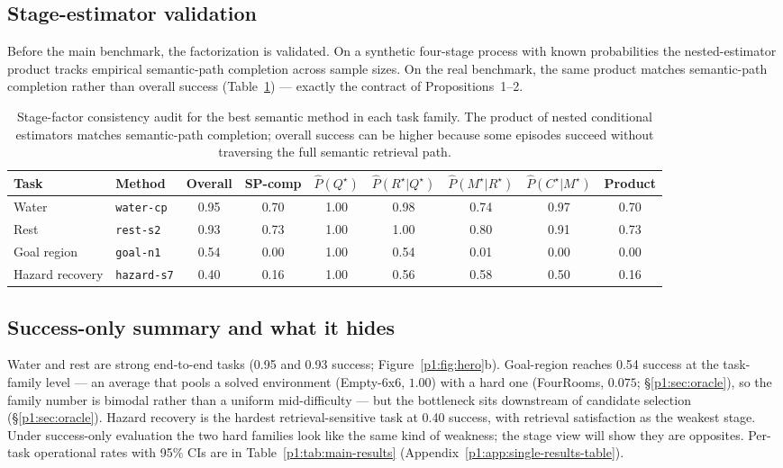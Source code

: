 \documentclass{article}
\begin{document}
\subsection{Stage-estimator validation}
\label{p1:sec:validation}

Before the main benchmark, the factorization is validated. On a
synthetic four-stage process with known probabilities the
nested-estimator product tracks empirical semantic-path completion
across sample sizes. On the real benchmark, the same product matches
semantic-path completion rather than overall success
(Table~\ref{p1:tab:consistency}) --- exactly the contract of
Propositions~1--2.

\begin{table}[t]
  \caption{Stage-factor consistency audit for the best semantic method in each task family. The product of nested conditional estimators matches semantic-path completion; overall success can be higher because some episodes succeed without traversing the full semantic retrieval path.}
  \label{p1:tab:consistency}
  \centering
  \small
  \begin{tabular}{p{1.7cm}p{2.5cm}c c c c c c c}
    \toprule
    Task & Method & Overall & SP-comp & $\hat P(Q^\star)$ & $\hat P(R^\star|Q^\star)$ & $\hat P(M^\star|R^\star)$ & $\hat P(C^\star|M^\star)$ & Product \\
    \midrule
    Water & \texttt{water-cp} & 0.95 & 0.70 & 1.00 & 0.98 & 0.74 & 0.97 & 0.70 \\
    Rest & \texttt{rest-s2} & 0.93 & 0.73 & 1.00 & 1.00 & 0.80 & 0.91 & 0.73 \\
    Goal region & \texttt{goal-n1} & 0.54 & 0.00 & 1.00 & 0.54 & 0.01 & 0.00 & 0.00 \\
    Hazard recovery & \texttt{hazard-s7} & 0.40 & 0.16 & 1.00 & 0.56 & 0.58 & 0.50 & 0.16 \\
    \bottomrule
  \end{tabular}
\end{table}

\subsection{Success-only summary and what it hides}
\label{p1:sec:single-results}

Water and rest are strong end-to-end tasks (0.95 and 0.93 success; Figure~\ref{p1:fig:hero}b). Goal-region reaches 0.54 success at the task-family level --- an average that pools a solved environment (Empty-6x6, $1.00$) with a hard one (FourRooms, $0.075$; \S\ref{p1:sec:oracle}), so the family number is bimodal rather than a uniform mid-difficulty --- but the bottleneck sits downstream of candidate selection (\S\ref{p1:sec:oracle}). Hazard recovery is the hardest retrieval-sensitive task at 0.40 success, with retrieval satisfaction as the weakest stage. Under success-only evaluation the two hard families look like the same kind of weakness; the stage view will show they are opposites. Per-task operational rates with 95\% CIs are in Table~\ref{p1:tab:main-results} (Appendix~\ref{p1:app:single-results-table}).
\end{document}
